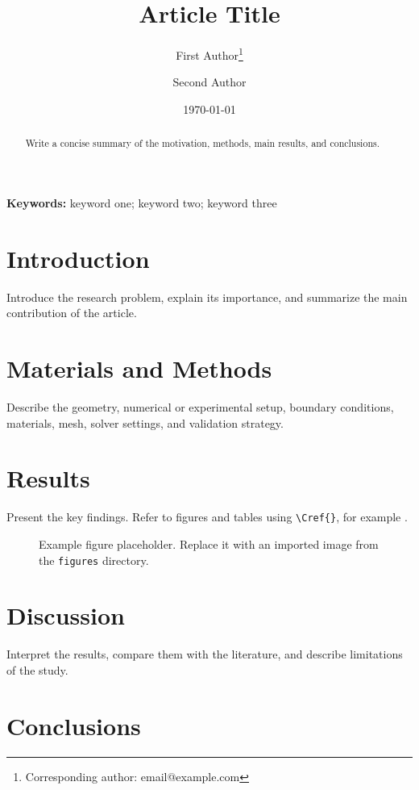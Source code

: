 \documentclass[11pt,a4paper]{article}
\title{Article Title}
\author{
  First Author\thanks{Corresponding author: email@example.com}
  \and Second Author
}
\date{\today}
\begin{document}
\maketitle

\begin{abstract}
Write a concise summary of the motivation, methods, main results, and conclusions.
\end{abstract}

\noindent\textbf{Keywords:} keyword one; keyword two; keyword three

\section{Introduction}
\label{sec:introduction}

Introduce the research problem, explain its importance, and summarize the main contribution of the article.

\section{Materials and Methods}
\label{sec:methods}

Describe the geometry, numerical or experimental setup, boundary conditions, materials, mesh, solver settings, and validation strategy.

\section{Results}
\label{sec:results}

Present the key findings. Refer to figures and tables using \verb|\Cref{}|, for example .

\begin{figure}[htbp]
  \centering
  \fbox{\rule{0pt}{4cm}\rule{0.8\linewidth}{0pt}}
  \caption{Example figure placeholder. Replace it with an imported image from the \texttt{figures} directory.}
  \label{fig:example}
\end{figure}

\section{Discussion}
\label{sec:discussion}

Interpret the results, compare them with the literature, and describe limitations of the study.

\section{Conclusions}
\label{sec:conclusions}
\end{document}
